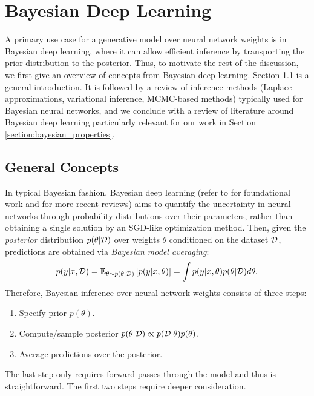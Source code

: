 
\chapter{Bayesian Deep Learning}\label{section:bayesian_dl}

A primary use case for a generative model over neural network weights is in Bayesian deep learning, where it can allow efficient inference by transporting the prior distribution to the posterior. Thus, to motivate the rest of the discussion, we first give an overview of concepts from Bayesian deep learning. Section \ref{section:bayesian_concepts} is a general introduction. It is followed by a review of inference methods (Laplace approximations, variational inference, MCMC-based methods) typically used for Bayesian neural networks, and we conclude with a review of literature around Bayesian deep learning particularly relevant for our work in Section \ref{section:bayesian_properties}.

\section{General Concepts} \label{section:bayesian_concepts}

In typical Bayesian fashion, Bayesian deep learning (refer to \citep{mackayBayesianMethodsAdaptive1992, nealBayesianLearningNeural1996} for foundational work and \citep{goanBayesianNeuralNetworks2020,arbelPrimerBayesianNeural2023} for more recent reviews) aims to quantify the uncertainty in neural networks through probability distributions over their parameters, rather than obtaining a single solution by an SGD-like optimization method. Then, given the \textit{posterior} distribution $p(\theta \vert \mathcal{D})$ over weights $\theta$ conditioned on the dataset $\mathcal{D}$, predictions are obtained via \textit{Bayesian model averaging}:
\begin{equation}
    p(y \vert x, \mathcal{D}) 
    = \mathbb{E}_{\theta \sim p(\theta \vert \mathcal{D})} \left[ p(y\vert x, \theta) \right]
    = \int p(y \vert x, \theta) p(\theta \vert \mathcal{D}) d\theta.
\end{equation}
Therefore, Bayesian inference over neural network weights consists of three steps:
\begin{enumerate}
    \item Specify prior $p(\theta)$.
    \item Compute/sample posterior $p(\theta \vert \mathcal{D}) \propto p(\mathcal{D} \vert \theta) p(\theta)$.
    \item Average predictions over the posterior. 
\end{enumerate}
The last step only requires forward passes through the model and thus is straightforward. The first two steps require deeper consideration. 

